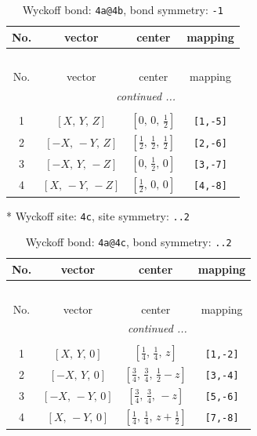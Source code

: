 \documentclass[fleqn,8pt]{jsarticle}
\begin{document}
\begin{longtable}{cccc}
\caption{Wyckoff bond: {\tt 4a@4b}, bond symmetry: {\tt -1}}
 \\
 \hline \hline
No. & vector & center & mapping \\ \hline \endfirsthead

\multicolumn{3}{l}{\tablename\ \thetable{}} \\
 \hline \hline
No. & vector & center & mapping \\ \hline \endhead

 \hline \hline
\multicolumn{3}{r}{\footnotesize\it continued ...} \\ \endfoot

 \hline \hline
\multicolumn{3}{r}{} \\ \endlastfoot

1 & $\left[ X,\, Y,\, Z \right]$ & $\left[ 0,\, 0,\, \frac{1}{2} \right]$ & {\tt [1,-5]} \\ \hline
2 & $\left[ - X,\, - Y,\, Z \right]$ & $\left[ \frac{1}{2},\, \frac{1}{2},\, \frac{1}{2} \right]$ & {\tt [2,-6]} \\ \hline
3 & $\left[ - X,\, Y,\, - Z \right]$ & $\left[ 0,\, \frac{1}{2},\, 0 \right]$ & {\tt [3,-7]} \\ \hline
4 & $\left[ X,\, - Y,\, - Z \right]$ & $\left[ \frac{1}{2},\, 0,\, 0 \right]$ & {\tt [4,-8]} \\
\end{longtable}
* Wyckoff site: {\tt 4c}, site symmetry: {\tt ..2}
\renewcommand{\arraystretch}{1.2}
\begin{longtable}{cccc}
\caption{Wyckoff bond: {\tt 4a@4c}, bond symmetry: {\tt ..2}}
 \\
 \hline \hline
No. & vector & center & mapping \\ \hline \endfirsthead

\multicolumn{3}{l}{\tablename\ \thetable{}} \\
 \hline \hline
No. & vector & center & mapping \\ \hline \endhead

 \hline \hline
\multicolumn{3}{r}{\footnotesize\it continued ...} \\ \endfoot

 \hline \hline
\multicolumn{3}{r}{} \\ \endlastfoot

1 & $\left[ X,\, Y,\, 0 \right]$ & $\left[ \frac{1}{4},\, \frac{1}{4},\, z \right]$ & {\tt [1,-2]} \\ \hline
2 & $\left[ - X,\, Y,\, 0 \right]$ & $\left[ \frac{3}{4},\, \frac{3}{4},\, \frac{1}{2} - z \right]$ & {\tt [3,-4]} \\ \hline
3 & $\left[ - X,\, - Y,\, 0 \right]$ & $\left[ \frac{3}{4},\, \frac{3}{4},\, - z \right]$ & {\tt [5,-6]} \\ \hline
4 & $\left[ X,\, - Y,\, 0 \right]$ & $\left[ \frac{1}{4},\, \frac{1}{4},\, z + \frac{1}{2} \right]$ & {\tt [7,-8]} \\
\end{longtable}
\end{document}

